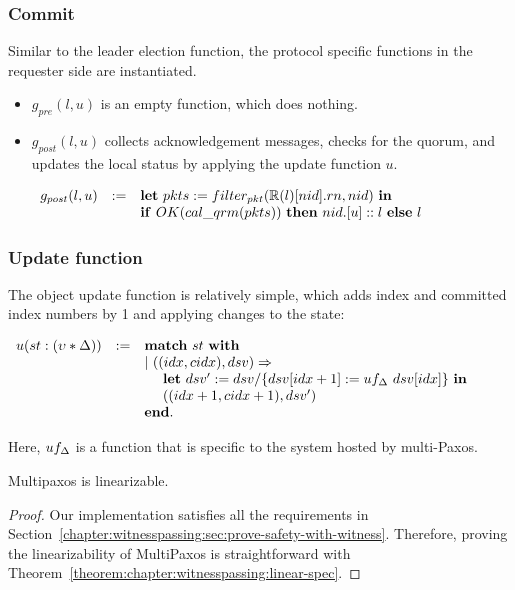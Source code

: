 \subsubsection{Commit}
Similar to the leader election function, the protocol specific functions in the requester side are instantiated. 
\begin{itemize}[leftmargin=*]
\item $g_{pre} (l, u)$ is an empty function, which does nothing.
\item $g_{post} (l, u)$ collects acknowledgement messages, checks for the
	quorum, and updates the local status by applying the update function
		$u$.
\begin{center}
$
\begin{array}{lll}
 g_{post} (l, u) &:=&  \mbox{\textbf{let}}\ pkts := filter_{pkt}(\replay(l)[nid].rn, nid) \ \mbox{\textbf{in}}\\
& & \mbox{\textbf{if}} \ OK(cal\_qrm(pkts)) \ \mbox{\textbf{then}} \ nid.[u]::l\ \mbox{\textbf{else}}\ l \\
\end{array}
$
\end{center}
\end{itemize}

\subsubsection{Update function}
The object update function is relatively simple, 
which adds index and committed index numbers by 1 and applying changes to the
state:
\begin{center}
$
\begin{array}{lll}
u (st : (\seqnum * \dsvalue))&:=&\mbox{\textbf{match}} \ st \ \mbox{\textbf{with}}\\
& & \vert~ ((idx, cidx), dsv)  \Rightarrow \\
& & \ \ \ \   \mbox{\textbf{let}}\ dsv' := dsv/\set{dsv[idx + 1] := uf_{\dsvalue}\ dsv[idx]} \ \mbox{\textbf{in}}\\
& & \ \ \ \ ((idx + 1, cidx + 1), dsv')\\
& &  \mbox{\textbf{end}}.\\
\end{array}
$
\end{center}
Here, $uf_{\Delta}$ is a function that is specific to the system hosted 
by multi-Paxos.

\begin{theorem}
Multipaxos is  linearizable.
\end{theorem}

\begin{proof}
Our implementation satisfies all the requirements in Section~\ref{chapter:witnesspassing:sec:prove-safety-with-witness}. 
Therefore, proving the linearizability of MultiPaxos is straightforward with Theorem~\ref{theorem:chapter:witnesspassing:linear-spec}.
\end{proof}
